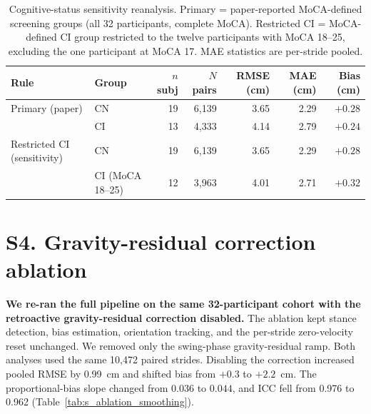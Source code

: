 \documentclass[fleqn,10pt,lineno]{wlpeerj}
\begin{document}
\begin{table}[!ht]
\centering
\caption{Cognitive-status sensitivity reanalysis. Primary = paper-reported MoCA-defined screening groups (all 32 participants, complete MoCA). Restricted CI = MoCA-defined CI group restricted to the twelve participants with MoCA 18--25, excluding the one participant at MoCA 17. MAE statistics are per-stride pooled.}
\label{tab:s_moca_sensitivity}
\small
\begin{tabular}{@{}llrrrrr@{}}
\toprule
Rule & Group & $n$ subj & $N$ pairs & RMSE (cm) & MAE (cm) & Bias (cm) \\
\midrule
Primary (paper)          & CN              & 19 & 6{,}139 & 3.65 & 2.29 & $+0.28$ \\
                         & CI              & 13 & 4{,}333 & 4.14 & 2.79 & $+0.24$ \\
\midrule
Restricted CI (sensitivity) & CN           & 19 & 6{,}139 & 3.65 & 2.29 & $+0.28$ \\
                         & CI (MoCA 18--25) & 12 & 3{,}963 & 4.01 & 2.71 & $+0.32$ \\
\bottomrule
\end{tabular}
\end{table}


\section*{S4. Gravity-residual correction ablation}

\textbf{We re-ran the full pipeline on the same 32-participant cohort with the retroactive gravity-residual correction disabled.} The ablation kept stance detection, bias estimation, orientation tracking, and the per-stride zero-velocity reset unchanged. We removed only the swing-phase gravity-residual ramp. Both analyses used the same 10{,}472 paired strides. Disabling the correction increased pooled RMSE by 0.99~cm and shifted bias from $+0.3$ to $+2.2$~cm. The proportional-bias slope changed from $0.036$ to $0.044$, and ICC fell from 0.976 to 0.962 (Table~\ref{tab:s_ablation_smoothing}).
\end{document}
